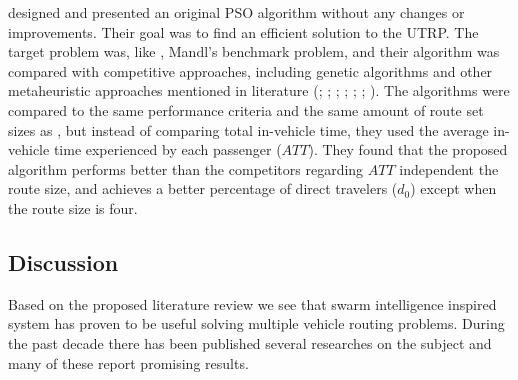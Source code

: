 \citet{kechagiopoulos14} designed and presented an original PSO algorithm without any changes or improvements. Their goal was to find an efficient solution to the UTRP. The target problem was, like \citet{nikolic14}, Mandl's benchmark problem, and their algorithm was compared with competitive approaches, including genetic algorithms and other metaheuristic approaches mentioned in literature (\citet{baaj91}; \citet{chakroborty02}; \citet{kidwai98}; \citet{fan10}; \citet{fan09-2}; \citet{zhang10}; \citet{chew12}). The algorithms were compared to the same performance criteria and the same amount of route set sizes as \citet{nikolic14}, but instead of comparing total in-vehicle time, they used the average in-vehicle time experienced by each passenger ($ATT$). They found that the proposed algorithm performs better than the competitors regarding $ATT$ independent the route size, and achieves a better percentage of direct travelers ($d_0$) except when the route size is four.  

\subsection{Discussion}

Based on the proposed literature review we see that swarm intelligence inspired system has proven to be useful solving multiple vehicle routing problems. During the past decade there has been published several researches on the subject and many of these report promising results. 

